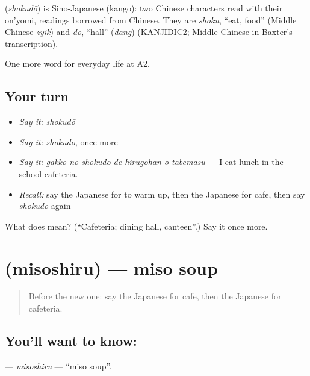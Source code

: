 \begin{cousinweb}
\textbf{} (\emph{shokudō}) is Sino-Japanese (kango): two Chinese characters read with their on'yomi, readings borrowed from Chinese. They are \emph{shoku}, \textquotedblleft{}eat, food\textquotedblright{} (Middle Chinese \emph{zyik}) and \emph{dō}, \textquotedblleft{}hall\textquotedblright{} (\emph{dang}) (KANJIDIC2; Middle Chinese in Baxter's transcription).
\end{cousinweb}

\begin{grammarlens}[title={What you've built}]
One more word for everyday life at A2.
\end{grammarlens}

\subsection*{Your turn}
\begin{itemize}
\raggedright
  \item \emph{Say it:} \emph{shokudō}
  \item \emph{Say it:} \emph{shokudō}, once more
  \item \emph{Say it:} \emph{gakkō no shokudō de hirugohan o tabemasu} — I eat lunch in the school cafeteria.
  \item \emph{Recall:} say the Japanese for to warm up, then the Japanese for cafe, then say \emph{shokudō} again
\end{itemize}

\begin{tcolorbox}[breakable,colback=teal!4,colframe=teal!35!black,title={Before you move on}]
What does  mean? (\textquotedblleft{}Cafeteria; dining hall, canteen\textquotedblright{}.) Say it once more.
\end{tcolorbox}
\section[\texorpdfstring{\ja{みそしる} (misoshiru)}{みそしる (misoshiru)}]{ (misoshiru) — miso soup}

\label{lesson:JA-C180-misoshiru}



\begin{quote}
Before the new one: say the Japanese for cafe, then the Japanese for cafeteria.
\end{quote}

\subsection*{You'll want to know: }
\textbf{} — \emph{misoshiru} — \textquotedblleft{}miso soup\textquotedblright{}.

